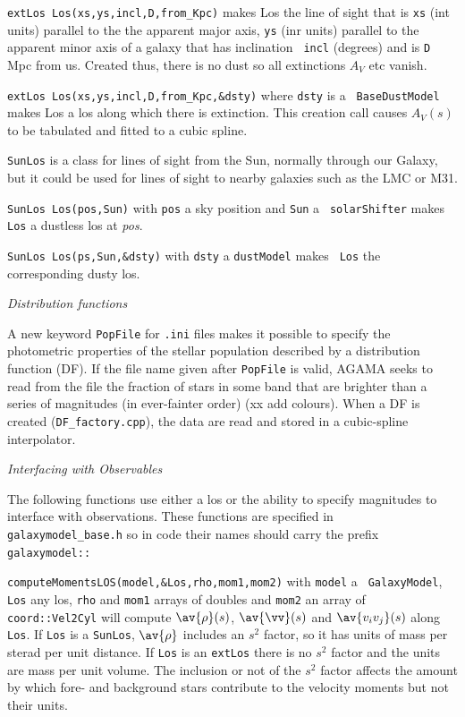 \nwsec
{\tt extLos Los(xs,ys,incl,D,from\_Kpc)} makes Los the line of sight that is
{\tt xs} (int units) parallel to the the apparent major axis, {\tt ys} (inr
units)
parallel to the apparent minor axis of a galaxy that has inclination {\tt
incl} (degrees) and is {\tt D} Mpc from us. Created thus, there is no dust so all extinctions $A_V$ etc
vanish.

\nwsec
{\tt extLos Los(xs,ys,incl,D,from\_Kpc,\&dsty)} where {\tt dsty} is a {\tt
BaseDustModel} makes Los a los along which there is extinction. This creation
call causes $A_V(s)$ to be tabulated and fitted to a cubic spline.

\nwsec
{\tt SunLos} is a class for lines of sight from the Sun, normally through our
Galaxy, but it could be used for lines of sight to nearby galaxies such as
the LMC or M31.

\nwsec
{\tt SunLos Los(pos,Sun)} with {\tt pos} a sky position and {\tt Sun} a {\tt
solarShifter} makes {\tt Los} a dustless los at {\it pos}.

\nwsec
{\tt SunLos Los(ps,Sun,\&dsty)} with {\tt dsty} a {\tt dustModel} makes {\tt
Los} the corresponding dusty los.

\bigskip
\centerline{\it Distribution functions}

\nwsec
A new keyword {\tt PopFile} for {\tt .ini} files makes it possible to
specify the photometric properties of the stellar population described by a
distribution function (DF). If the file name given after  {\tt PopFile} is
valid, AGAMA seeks to read from the file the fraction of stars in some band
that are brighter than a series of magnitudes (in ever-fainter order) (xx add
colours). When a DF is created ({\tt DF\_factory.cpp}), the data are read and
stored in a cubic-spline interpolator.

\bigskip
\centerline{\it Interfacing with Observables} 

\nwsec
The following functions use either a los or the ability to specify magnitudes
to interface with observations. These functions are specified in {\tt
galaxymodel\_base.h} so in code their names should carry the prefix {\tt
galaxymodel::}

\nwsec
{\tt computeMomentsLOS(model,\&Los,rho,mom1,mom2)} with {\tt model} a {\tt
GalaxyModel},
{\tt Los} any los, {\tt rho} and {\tt mom1} arrays of doubles and {\tt mom2}
an array of {\tt 
coord::Vel2Cyl} will compute $\av{\rho}(s)$, $\av{\vv}(s)$ and
$\av{v_iv_j}(s)$ along {\tt Los}. If {\tt Los} is a {\tt SunLos}, $\av{\rho}$
includes an $s^2$ factor, so it has units of mass per sterad per unit
distance. If {\tt Los} is an {\tt extLos} there is no $s^2$ factor and the
units are mass per unit volume. The inclusion or not of the $s^2$ factor
affects the amount by which fore- and background stars contribute to the
velocity moments but not their units.

